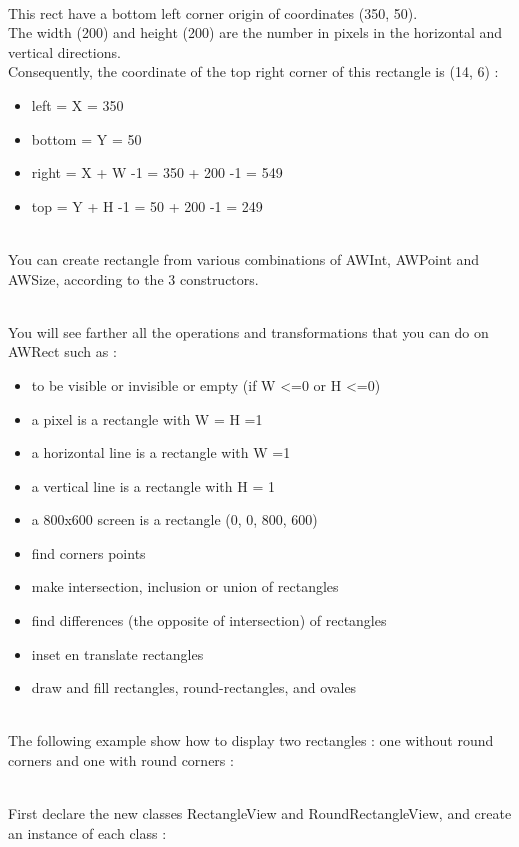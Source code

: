 \documentclass[a4paper,11pt]{extarticle}
\begin{document}
~\\ This rect have a bottom left corner origin of coordinates (350, 50).
~\\ The width (200) and height (200) are the number in pixels in the horizontal and vertical directions.
~\\ Consequently, the coordinate of the top right corner of this rectangle is (14, 6) :
\begin{itemize}
\item left = X = 350
\item bottom = Y = 50
\item right = X + W -1 = 350 + 200 -1 = 549
\item top = Y + H -1 = 50 + 200 -1 = 249
\end{itemize}


~\\ You can create rectangle from various combinations of AWInt, AWPoint and AWSize, according to the 3 constructors. 

~\\ You will see farther all the operations and transformations that you can do on AWRect such as :
\begin{itemize}
\item to be visible or invisible or empty (if W <=0 or H <=0)
\item a pixel is a rectangle with W = H =1
\item a horizontal line is a rectangle with W =1
\item a vertical line is a rectangle with H = 1
\item a 800x600 screen is a rectangle (0, 0, 800, 600)
\item find corners points
\item make intersection, inclusion or union of rectangles
\item find differences (the opposite of intersection) of rectangles
\item inset en translate rectangles
\item draw and fill rectangles, round-rectangles, and ovales
\end{itemize}

~\\The following example show how to display two rectangles : one without round corners and one with round corners :

~\\ First declare the new classes  RectangleView and RoundRectangleView, and create an instance of each class :
\end{document}
